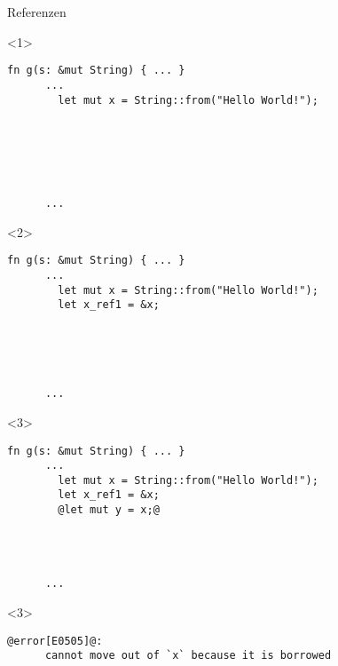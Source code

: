 

\lstset{showstringspaces=true,columns=fullflexible,keepspaces=true}

\begin{frame}[fragile]{Referenzen}


  \begin{onlyenv}<1> {
    \begin{lstlisting}[frame=single,style=base]
      fn g(s: &mut String) { ... }
      ...
        let mut x = String::from("Hello World!");






      ...\end{lstlisting}
  }
  \end{onlyenv}


  \begin{onlyenv}<2> {
    \begin{lstlisting}[frame=single,style=base]
      fn g(s: &mut String) { ... }
      ...
        let mut x = String::from("Hello World!");
        let x_ref1 = &x;





      ...\end{lstlisting}
  }
  \end{onlyenv}


  \begin{onlyenv}<3> {
    \begin{lstlisting}[frame=single,style=base]
      fn g(s: &mut String) { ... }
      ...
        let mut x = String::from("Hello World!");
        let x_ref1 = &x;
        @let mut y = x;@




      ...\end{lstlisting}
  }
  \end{onlyenv}

  \begin{onlyenv}<3> {
    \begin{lstlisting}[frame=single,style=base]
      @error[E0505]@:
      cannot move out of `x` because it is borrowed\end{lstlisting}
  }
  \end{onlyenv}


\end{frame}
